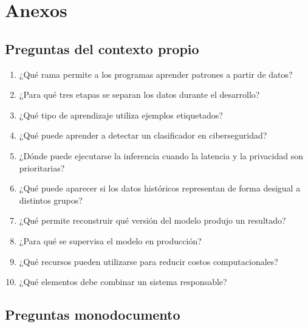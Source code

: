 \documentclass[12pt,letterpaper]{article}
\begin{document}
\clearpage
\setcounter{section}{17}
\section{Anexos}
\label{inicio-anexos}

\subsection{Preguntas del contexto propio}

\begin{enumerate}\small
  \item ¿Qué rama permite a los programas aprender patrones a partir de datos?
  \item ¿Para qué tres etapas se separan los datos durante el desarrollo?
  \item ¿Qué tipo de aprendizaje utiliza ejemplos etiquetados?
  \item ¿Qué puede aprender a detectar un clasificador en ciberseguridad?
  \item ¿Dónde puede ejecutarse la inferencia cuando la latencia y la
  privacidad son prioritarias?
  \item ¿Qué puede aparecer si los datos históricos representan de forma
  desigual a distintos grupos?
  \item ¿Qué permite reconstruir qué versión del modelo produjo un resultado?
  \item ¿Para qué se supervisa el modelo en producción?
  \item ¿Qué recursos pueden utilizarse para reducir costos computacionales?
  \item ¿Qué elementos debe combinar un sistema responsable?
\end{enumerate}

\subsection{Preguntas monodocumento}
\end{document}
